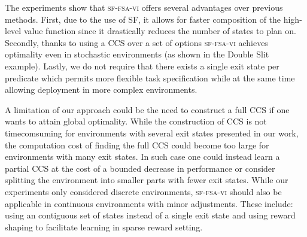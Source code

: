 The experiments show that \textsc{sf-fsa-vi} offers several advantages over previous methods. First, due to the use of SF, it allows for faster composition of the high-level value function since it drastically reduces the number of states to plan on. Secondly, thanks to using a CCS over a set of options \textsc{sf-fsa-vi} achieves optimality even in stochastic environments (as shown in the Double Slit example). Lastly, we do not require that there exists a single exit state per predicate which permits more flexible task specification while at the same time allowing deployment in more complex environments. 

A limitation of our approach could be the need to construct a full CCS if one wants to attain global optimality. While the construction of CCS is not timecomsuming for environments with several exit states presented in our work, the computation cost of finding the full CCS could become too large for environments with many exit states. In such case one could instead learn a partial CCS at the cost of a bounded decrease in performance \citep{Alegre2022} or consider splitting the environment into smaller parts with fewer exit states. While our experiments only considered discrete environments, \textsc{sf-fsa-vi} should also be applicable in continuous environments with minor adjustments. These include: using an contiguous set of states instead of a single exit state and using reward shaping to facilitate learning in sparse reward setting.